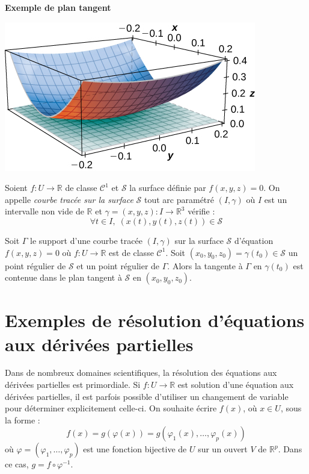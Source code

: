 \documentclass[french,11pt,twoside]{VcCours}
\begin{document}
\medskip

\begin{center}
\textbf{Exemple de plan tangent}
\end{center}

\begin{center}
\includegraphics[scale=1]{tan}
\end{center}

\begin{Definition}{} Soient $f : U \rightarrow \mathbb{R}$ de classe $\mathcal{C}^1$ et $\mathcal{S}$ la surface définie par $f(x,y,z)=0$. On appelle \emph{courbe tracée sur la surface} $\mathcal{S}$ tout arc paramétré $(I, \gamma)$ où $I$ est un intervalle non vide de $\mathbb{R}$ et $ \gamma =(x,y,z) : I \rightarrow \mathbb{R}^3$ vérifie :
$$ \forall t \in I, \; (x(t),y(t),z(t)) \in \mathcal{S}$$
\end{Definition}

\begin{Proposition}{} Soit $\Gamma$ le support d'une courbe tracée $(I, \gamma)$ sur la surface $\mathcal{S}$ d'équation $f(x,y,z)=0$ où $f : U \rightarrow \mathbb{R}$ est de classe $\mathcal{C}^1$.  Soit $(x_0,y_0,z_0)= \gamma(t_0)  \in \mathcal{S}$ un point régulier de $\mathcal{S}$ et un point régulier de $\Gamma$. Alors la tangente à $\Gamma$ en $\gamma(t_0)$ est contenue dans le plan tangent à $\mathcal{S}$ en $(x_0,y_0,z_0)$.
\end{Proposition}

%



\section{Exemples de résolution d'équations aux dérivées partielles}
Dans de nombreux domaines scientifiques, la résolution des équations aux dérivées partielles est primordiale. Si $f : U \rightarrow \mathbb{R}$ est solution d'une équation aux dérivées partielles, il est parfois possible d'utiliser un changement de variable pour déterminer explicitement celle-ci. On souhaite écrire $f(x)$, où $x \in U$, sous la forme :
$$ f(x) = g(\varphi(x)) = g(\varphi_1(x), \ldots, \varphi_p(x))$$
où $\varphi= (\varphi_1, \ldots, \varphi_p)$ est une fonction bijective de $U$ sur un ouvert $V$ de $\mathbb{R}^p$. Dans ce cas, $g = f \circ \varphi^{-1}$. 
\end{document}
